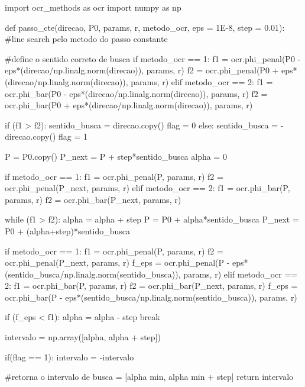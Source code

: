 \documentclass[10pt, a4paper]{article}
\begin{document}
\begin{python}
  import ocr_methods as ocr
  import numpy as np
  
  def passo_cte(direcao, P0, params, r, metodo_ocr, eps = 1E-8, step = 0.01):
      #line search pelo metodo do passo constante
      
      #define o sentido correto de busca
      if metodo_ocr == 1:
          f1 = ocr.phi_penal(P0 - eps*(direcao/np.linalg.norm(direcao)), params, r)
          f2 = ocr.phi_penal(P0 + eps*(direcao/np.linalg.norm(direcao)), params, r)
      elif metodo_ocr == 2:
          f1 = ocr.phi_bar(P0 - eps*(direcao/np.linalg.norm(direcao)), params, r)
          f2 = ocr.phi_bar(P0 + eps*(direcao/np.linalg.norm(direcao)), params, r)
          
      if (f1 > f2):
          sentido_busca = direcao.copy()
          flag = 0
      else:
          sentido_busca = -direcao.copy()
          flag = 1
          
      P = P0.copy()
      P_next = P + step*sentido_busca
      alpha = 0
      
      if metodo_ocr == 1:
          f1 = ocr.phi_penal(P, params, r)
          f2 = ocr.phi_penal(P_next, params, r)
      elif metodo_ocr == 2:
          f1 = ocr.phi_bar(P, params, r)
          f2 = ocr.phi_bar(P_next, params, r)
        
      while (f1 > f2):           
          alpha = alpha + step
          P = P0 + alpha*sentido_busca
          P_next = P0 + (alpha+step)*sentido_busca        
          
          if metodo_ocr == 1:
              f1 = ocr.phi_penal(P, params, r)
              f2 = ocr.phi_penal(P_next, params, r)
              f_eps = ocr.phi_penal(P - eps*(sentido_busca/np.linalg.norm(sentido_busca)), params, r)
          elif metodo_ocr == 2:
              f1 = ocr.phi_bar(P, params, r)
              f2 = ocr.phi_bar(P_next, params, r)
              f_eps = ocr.phi_bar(P - eps*(sentido_busca/np.linalg.norm(sentido_busca)), params, r)
              
          if (f_eps < f1):
              alpha = alpha - step
              break
      
      intervalo = np.array([alpha, alpha + step])
      
      if(flag == 1):
          intervalo = -intervalo
          
      #retorna o intervalo de busca = [alpha min, alpha min + step]                 
      return intervalo
      

\end{python}
\end{document}
